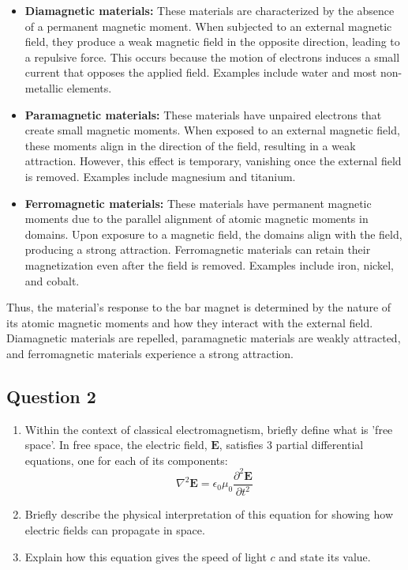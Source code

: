 \documentclass{article}
\begin{document}
\begin{itemize}
    \item \textbf{Diamagnetic materials:} These materials are characterized by the absence of a permanent magnetic moment. When subjected to an external magnetic field, they produce a weak magnetic field in the opposite direction, leading to a repulsive force. This occurs because the motion of electrons induces a small current that opposes the applied field. Examples include water and most non-metallic elements.
    \item \textbf{Paramagnetic materials:} These materials have unpaired electrons that create small magnetic moments. When exposed to an external magnetic field, these moments align in the direction of the field, resulting in a weak attraction. However, this effect is temporary, vanishing once the external field is removed. Examples include magnesium and titanium.
    \item \textbf{Ferromagnetic materials:} These materials have permanent magnetic moments due to the parallel alignment of atomic magnetic moments in domains. Upon exposure to a magnetic field, the domains align with the field, producing a strong attraction. Ferromagnetic materials can retain their magnetization even after the field is removed. Examples include iron, nickel, and cobalt.
\end{itemize}

Thus, the material's response to the bar magnet is determined by the nature of its atomic magnetic moments and how they interact with the external field. Diamagnetic materials are repelled, paramagnetic materials are weakly attracted, and ferromagnetic materials experience a strong attraction.


\subsection{Question 2}
\begin{enumerate}
    \item Within the context of classical electromagnetism, briefly define what is 'free space'. In free space, the electric field, $\mathbf{E}$, satisfies 3 partial differential equations, one for each of its components:
    \[
    \nabla^2 \mathbf{E} = \epsilon_0 \mu_0 \frac{\partial^2 \mathbf{E}}{\partial t^2}
    \]
    \item Briefly describe the physical interpretation of this equation for showing how electric fields can propagate in space.
    \item Explain how this equation gives the speed of light $c$ and state its value.
\end{enumerate}
\end{document}
